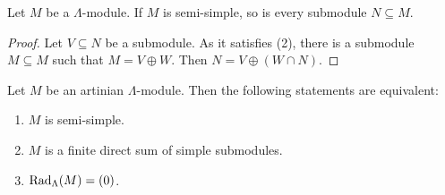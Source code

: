 
\begin{lemma}\label{1.2.2}
Let $M$ be a $\Lambda$-module. If $M$ is semi-simple, so is every submodule $N\subseteq M$. 
\end{lemma}


\begin{proof}
Let $V\subseteq N$ be a submodule. As it satisfies (2), there is a submodule $M\subseteq M$ such that $M=V\oplus W$. Then $N=V\oplus (W\cap N)$.
\end{proof}


\begin{proposition}\label{1.2.3}
Let $M$ be an artinian $\Lambda$-module. Then the following statements are equivalent:
\begin{enumerate}
\item $M$ is semi-simple.
\item $M$ is a finite direct sum of simple submodules.
\item $\operatorname{Rad}_\Lambda(M)=(0)$.
\end{enumerate}
\end{proposition}



